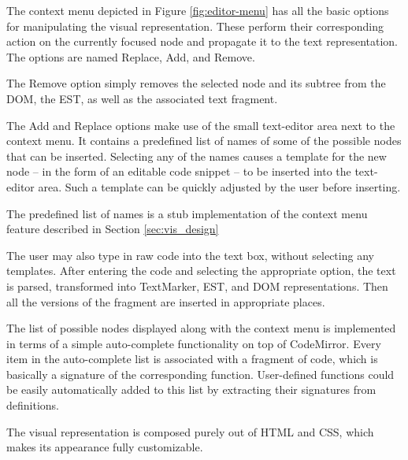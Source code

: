 The context menu depicted in Figure \ref{fig:editor-menu} has all the basic options for manipulating the visual representation. These perform their corresponding action on the currently focused node and propagate it to the text representation. The options are named Replace, Add, and Remove.

The Remove option simply removes the selected node and its subtree from the
DOM, the EST, as well as the associated text fragment.

The Add and Replace options make use of the small text-editor area next to the context menu. It contains a predefined list of names of some of the possible nodes that can be inserted. Selecting any of the names causes a template for the new node -- in the form of an editable code snippet -- to be inserted into the text-editor area. Such a template can be quickly adjusted by the user before inserting.

The predefined list of names is a stub implementation of the context menu feature described in Section \ref{sec:vis_design}

The user may also type in raw code into the text box, without selecting any templates. After entering the code and selecting the appropriate option, the text is parsed, transformed into TextMarker, EST, and DOM representations. Then all the versions of the fragment are inserted in appropriate places.

The list of possible nodes displayed along with the context menu is implemented
in terms of a simple auto-complete functionality on top of CodeMirror. Every item in the auto-complete list is associated with a fragment of code, which is
basically a signature of the corresponding function. User-defined functions
could be easily automatically added to this list by extracting their signatures
from definitions.

The visual representation is composed purely out of HTML and CSS, which makes its appearance fully customizable.